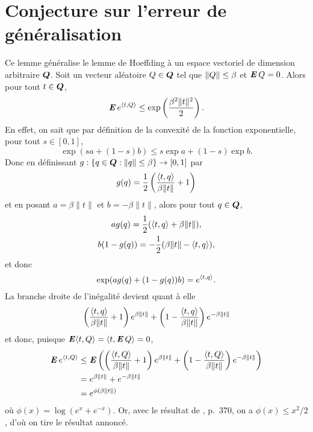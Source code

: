 \section{Conjecture sur l'erreur de généralisation}


\begin{lemme}
  \label{b:lem:hoeffding}
  Ce lemme généralise le lemme de Hoeffding à un espace vectoriel de dimension arbitraire
  $\bm Q$. Soit un vecteur aléatoire $Q\in\bm Q$ tel que $\|Q\|\leq\beta$ et $\operatorname{\mbox{\textbf{\textit{E}}}} Q = 0$. Alors pour tout
  $t\in\bm Q$, 
  \begin{equation}
    \operatorname{\mbox{\textbf{\textit{E}}}} e^{\langle t,Q\rangle} \leq \exp\left(\frac{\beta^2\|t\|^2}{2}\right).
  \end{equation}
  En effet, on sait que par définition de la convexité de la fonction exponentielle, pour
  tout $s\in[0,1]$,
  \begin{equation}
    \exp(sa + (1-s)b) \leq s\exp a + (1-s)\exp b.
  \end{equation}
  Donc en définissant $g:\{q \in \bm Q:\|q\|\leq\beta\}\to[0,1]$ par
  \begin{equation}
    g(q) = \frac{1}{2}\left(\frac{\langle t,q\rangle}{\beta\|t\|} + 1\right)
  \end{equation}
  et en posant $a = \beta\|t\|$ et $b = -\beta\|t\|$, alors pour tout $q \in \bm Q$,
  \begin{gather}
    a g(q) = \frac{1}{2}(\langle t,q\rangle + \beta\|t\|),\\
    b (1-g(q)) = - \frac{1}{2}(\beta\|t\| - \langle t,q\rangle),
  \end{gather}
  et donc
  \begin{equation}
    \exp(ag(q) + (1-g(q))b) = e^{\langle t,q\rangle}.
  \end{equation}
  La branche droite de l'inégalité devient quant à elle
  \begin{equation}
    \left(\frac{\langle t,q\rangle}{\beta\|t\|} + 1\right)e^{\beta\|t\|} + \left(1-\frac{\langle t,q\rangle}{\beta\|t\|}\right)e^{-\beta\|t\|}
  \end{equation}
  et donc, puisque $\operatorname{\mbox{\textbf{\textit{E}}}}\langle t,Q\rangle = \langle t,\operatorname{\mbox{\textbf{\textit{E}}}} Q\rangle = 0$, 
  \begin{align}
    \operatorname{\mbox{\textbf{\textit{E}}}} e^{\langle t,Q\rangle} &\leq \operatorname{\mbox{\textbf{\textit{E}}}}\left(\left(\frac{\langle t,Q\rangle}{\beta\|t\|} + 1\right)e^{\beta\|t\|} +
                       \left(1-\frac{\langle t,Q\rangle}{\beta\|t\|}\right)e^{-\beta\|t\|}\right)\\
                     &= e^{\beta\|t\|} + e^{-\beta\|t\|}\\
                     &= e^{\phi(\beta\|t\|)}
  \end{align}
  où $\phi(x) = \log(e^{x} + e^{-x})$. Or, avec le résultat de \cite{mohri2012foundations},
  p.~370, on a $\phi(x) \leq x^2/2$, d'où on tire le résultat annoncé.
\end{lemme}

